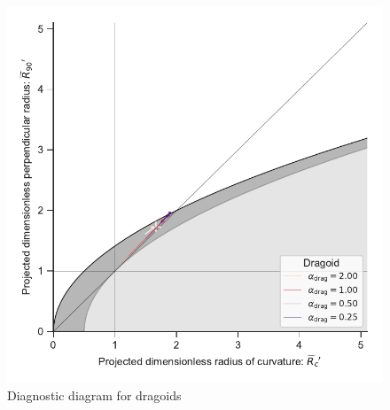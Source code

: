 \begin{figure}
  \centering
  \includegraphics[width=\linewidth]{figs/dragoid-R90-vs-Rc}
  \caption{Diagnostic diagram for dragoids}
  \label{fig:dragoid-Rc-R90}
\end{figure}

